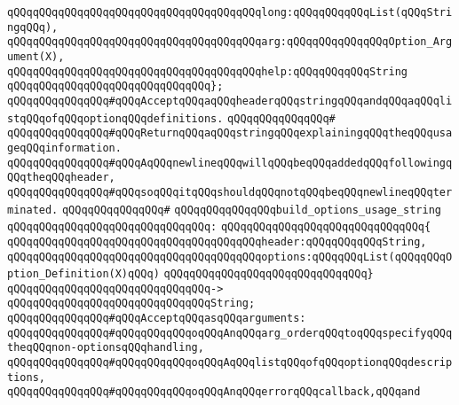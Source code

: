 \verb|qQQqqQQqqQQqqQQqqQQqqQQqqQQqqQQqqQQqqQQqlong:qQQqqQQqqQQqList(qQQqStringqQQq),|\newline
\verb|qQQqqQQqqQQqqQQqqQQqqQQqqQQqqQQqqQQqqQQqarg:qQQqqQQqqQQqqQQqOption_Argument(X),|\newline
\verb|qQQqqQQqqQQqqQQqqQQqqQQqqQQqqQQqqQQqqQQqhelp:qQQqqQQqqQQqString|\newline
\verb|qQQqqQQqqQQqqQQqqQQqqQQqqQQqqQQq};|\newline
\newline
\verb|qQQqqQQqqQQqqQQq#qQQqAcceptqQQqaqQQqheaderqQQqstringqQQqandqQQqaqQQqlistqQQqofqQQqoptionqQQqdefinitions.|\newline
\verb|qQQqqQQqqQQqqQQq#|\newline
\verb|qQQqqQQqqQQqqQQq#qQQqReturnqQQqaqQQqstringqQQqexplainingqQQqtheqQQqusageqQQqinformation.|\newline
\verb|qQQqqQQqqQQqqQQq#qQQqAqQQqnewlineqQQqwillqQQqbeqQQqaddedqQQqfollowingqQQqtheqQQqheader,|\newline
\verb|qQQqqQQqqQQqqQQq#qQQqsoqQQqitqQQqshouldqQQqnotqQQqbeqQQqnewlineqQQqterminated.|\newline
\verb|qQQqqQQqqQQqqQQq#|\newline
\verb|qQQqqQQqqQQqqQQqbuild_options_usage_string|\newline
\verb|qQQqqQQqqQQqqQQqqQQqqQQqqQQqqQQq:|\newline
\verb|qQQqqQQqqQQqqQQqqQQqqQQqqQQqqQQq{|\newline
\verb|qQQqqQQqqQQqqQQqqQQqqQQqqQQqqQQqqQQqqQQqheader:qQQqqQQqqQQqString,|\newline
\verb|qQQqqQQqqQQqqQQqqQQqqQQqqQQqqQQqqQQqqQQqoptions:qQQqqQQqList(qQQqqQQqOption_Definition(X)qQQq)|\newline
\verb|qQQqqQQqqQQqqQQqqQQqqQQqqQQqqQQq}|\newline
\verb|qQQqqQQqqQQqqQQqqQQqqQQqqQQqqQQq->|\newline
\verb|qQQqqQQqqQQqqQQqqQQqqQQqqQQqqQQqString;|\newline
\newline
\newline
\verb|qQQqqQQqqQQqqQQq#qQQqAcceptqQQqasqQQqarguments:|\newline
\verb|qQQqqQQqqQQqqQQq#qQQqqQQqqQQqoqQQqAnqQQqarg_orderqQQqtoqQQqspecifyqQQqtheqQQqnon-optionsqQQqhandling,|\newline
\verb|qQQqqQQqqQQqqQQq#qQQqqQQqqQQqoqQQqAqQQqlistqQQqofqQQqoptionqQQqdescriptions,|\newline
\verb|qQQqqQQqqQQqqQQq#qQQqqQQqqQQqoqQQqAnqQQqerrorqQQqcallback,qQQqand|\newline

